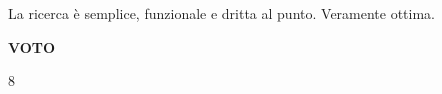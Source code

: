 La ricerca è semplice, funzionale e dritta al punto. Veramente ottima.
\begin{center}
\begin{Large}
\textbf{VOTO}\\
\vspace{0.1cm}
\end{Large}
\begin{huge}
8
\end{huge}
\end{center}
